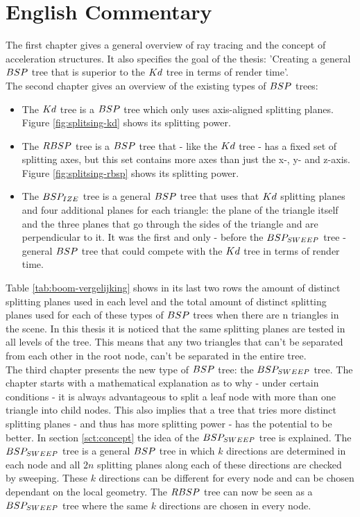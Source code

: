 \chapter{English Commentary}

The first chapter gives a general overview of ray tracing and the concept of acceleration structures.
It also specifies the goal of the thesis: 'Creating a general $BSP$ tree that is superior to the $Kd$ tree in terms of render time'.\\

The second chapter gives an overview of the existing types of $BSP$ trees:
\begin{itemize}
  \item The $Kd$ tree is a $BSP$ tree which only uses axis-aligned splitting planes. Figure \ref{fig:splitsing-kd} shows its splitting power.
  \item The $RBSP$ tree is a $BSP$ tree that - like the $Kd$ tree - has a fixed set of splitting axes, but this set contains more axes than just the x-, y- and z-axis. Figure \ref{fig:splitsing-rbsp} shows its splitting power.
  \item The $BSP_{IZE}$ tree is a general $BSP$ tree that uses that $Kd$ splitting planes and four additional planes for each triangle: the plane of the triangle itself and the three planes that go through the sides of the triangle and are perpendicular to it. 
  It was the first and only - before the $BSP_{SWEEP}$ tree - general $BSP$ tree that could compete with the $Kd$ tree in terms of render time.
\end{itemize}

Table \ref{tab:boom-vergelijking} shows in its last two rows the amount of distinct splitting planes used in each level and the total amount of distinct splitting planes used for each of these types of $BSP$ trees when there are n triangles in the scene.
In this thesis it is noticed that the same splitting planes are tested in all levels of the tree.
This means that any two triangles that can't be separated from each other in the root node, can't be separated in the entire tree.\\

The third chapter presents the new type of $BSP$ tree: the $BSP_{SWEEP}$ tree.
The chapter starts with a mathematical explanation as to why - under certain conditions - it is always advantageous to split a leaf node with more than one triangle into child nodes.
This also implies that a tree that tries more distinct splitting planes - and thus has more splitting power - has the potential to be better.
In section \ref{sct:concept} the idea of the $BSP_{SWEEP}$ tree is explained.
The $BSP_{SWEEP}$ tree is a general $BSP$ tree in which $k$ directions are determined in each node and all $2n$ splitting planes along each of these directions are checked by sweeping. 
These $k$ directions can be different for every node and can be chosen dependant on the local geometry.
The $RBSP$ tree can now be seen as a $BSP_{SWEEP}$ tree where the same $k$ directions are chosen in every node.\\

